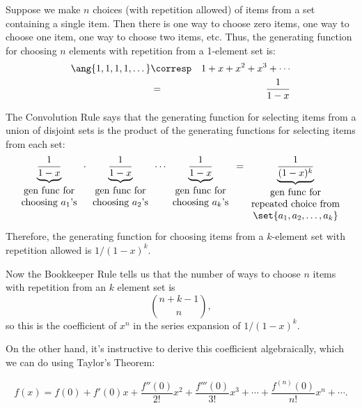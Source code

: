 Suppose we make $n$ choices (with repetition allowed) of items from a set
containing a single item.  Then there is one way to choose zero items, one
way to choose one item, one way to choose two items, etc.  Thus, the
generating function for choosing $n$ elements with repetition from a
1-element set is:
%
\begin{eqnarray*}
\ang{1, 1, 1, 1, \dots}
     & \corresp & 1 + x + x^2 + x^3 + \cdots \\
     & = & \frac{1}{1-x}
\end{eqnarray*}

The Convolution Rule says that the generating function for selecting
items from a union of disjoint sets is the product of the generating
functions for selecting items from each set:
%
\[
\underbrace{\frac{1}{1-x}}_{
\begin{array}{cc}
\mbox{gen func for} \\
\text{choosing $a_1$'s}
\end{array}}
\cdot
\underbrace{\frac{1}{1-x}}_{
\begin{array}{cc}
\mbox{gen func for} \\
\text{choosing $a_2$'s}
\end{array}}
\cdots
\underbrace{\frac{1}{1-x}}_{
\begin{array}{cc}
\mbox{gen func for} \\
\text{choosing $a_k$'s}
\end{array}}
=
\underbrace{\frac{1}{(1-x)^k}}_{
\begin{array}{cc}
\mbox{gen func for} \\
\text{repeated choice from} \\
\set{a_1, a_2, \dots, a_k}
\end{array}}
\]
%
Therefore, the generating function for choosing items from a
$k$-element set with repetition allowed is $1 / (1 - x)^k$.

Now the Bookkeeper Rule tells us that the number of ways to choose $n$
items with repetition from an $k$ element set is
\[
\binom{n+k-1}{n},
\]
so this is the coefficient of $x^n$ in the series expansion of $1 / (1 -
x)^k$.

On the other hand, it's instructive to derive this coefficient
algebraically, which we can do using Taylor's Theorem:

\begin{theorem}
\[
f(x) = f(0) + f'(0) x + \frac{f''(0)}{2!} x^2 + \frac{f'''(0)}{3!} x^3 + \cdots
+ \frac{f^{(n)}(0)}{n!} x^n + \cdots.
\]
\end{theorem}

